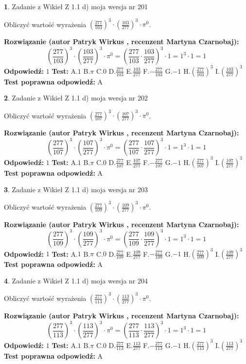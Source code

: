 \documentclass[12pt, a4paper]{article}
\theoremstyle{definition} %
\newtheorem{zad}{}
\newcommand{\zadStart}[1]{\begin{zad}#1\newline}
\newcommand{\zadStop}{\end{zad}}
\newcommand{\rozwStart}[2]{\noindent \textbf{Rozwiązanie (autor #1 , recenzent #2): }\newline}
\newcommand{\rozwStop}{\newline}
\newcommand{\odpStart}{\noindent \textbf{Odpowiedź:}\newline}
\newcommand{\odpStop}{\newline}
\newcommand{\testStart}{\noindent \textbf{Test:}\newline}
\newcommand{\testStop}{\newline}
\newcommand{\kluczStart}{\noindent \textbf{Test poprawna odpowiedź:}\newline}
\newcommand{\kluczStop}{\newline}
\begin{document}
\zadStart{Zadanie z Wikieł Z 1.1 d) moja wersja nr 201}

Obliczyć wartość wyrażenia $(\frac{277}{103})^{3} \cdot (\frac{103}{277})^{3} \cdot \pi^{0}$.
\zadStop
\rozwStart{Patryk Wirkus}{Martyna Czarnobaj}
$$(\frac{277}{103})^{3} \cdot (\frac{103}{277})^{3} \cdot \pi^{0} = (\frac{277}{103} \cdot \frac{103}{277})^{3} \cdot 1 = 1^{3} \cdot 1 = 1$$
\rozwStop
\odpStart
$1$
\odpStop
\testStart
A.$1$ B.$\pi$ C.$0$ D.$\frac{277}{103}$ E.$\frac{103}{277}$
F.$-\frac{277}{103}$ G.$-1$
H.$(\frac{277}{103})^{3}$
I.$(\frac{103}{277})^{3}$
\testStop
\kluczStart
A
\kluczStop



\zadStart{Zadanie z Wikieł Z 1.1 d) moja wersja nr 202}

Obliczyć wartość wyrażenia $(\frac{277}{107})^{3} \cdot (\frac{107}{277})^{3} \cdot \pi^{0}$.
\zadStop
\rozwStart{Patryk Wirkus}{Martyna Czarnobaj}
$$(\frac{277}{107})^{3} \cdot (\frac{107}{277})^{3} \cdot \pi^{0} = (\frac{277}{107} \cdot \frac{107}{277})^{3} \cdot 1 = 1^{3} \cdot 1 = 1$$
\rozwStop
\odpStart
$1$
\odpStop
\testStart
A.$1$ B.$\pi$ C.$0$ D.$\frac{277}{107}$ E.$\frac{107}{277}$
F.$-\frac{277}{107}$ G.$-1$
H.$(\frac{277}{107})^{3}$
I.$(\frac{107}{277})^{3}$
\testStop
\kluczStart
A
\kluczStop



\zadStart{Zadanie z Wikieł Z 1.1 d) moja wersja nr 203}

Obliczyć wartość wyrażenia $(\frac{277}{109})^{3} \cdot (\frac{109}{277})^{3} \cdot \pi^{0}$.
\zadStop
\rozwStart{Patryk Wirkus}{Martyna Czarnobaj}
$$(\frac{277}{109})^{3} \cdot (\frac{109}{277})^{3} \cdot \pi^{0} = (\frac{277}{109} \cdot \frac{109}{277})^{3} \cdot 1 = 1^{3} \cdot 1 = 1$$
\rozwStop
\odpStart
$1$
\odpStop
\testStart
A.$1$ B.$\pi$ C.$0$ D.$\frac{277}{109}$ E.$\frac{109}{277}$
F.$-\frac{277}{109}$ G.$-1$
H.$(\frac{277}{109})^{3}$
I.$(\frac{109}{277})^{3}$
\testStop
\kluczStart
A
\kluczStop



\zadStart{Zadanie z Wikieł Z 1.1 d) moja wersja nr 204}

Obliczyć wartość wyrażenia $(\frac{277}{113})^{3} \cdot (\frac{113}{277})^{3} \cdot \pi^{0}$.
\zadStop
\rozwStart{Patryk Wirkus}{Martyna Czarnobaj}
$$(\frac{277}{113})^{3} \cdot (\frac{113}{277})^{3} \cdot \pi^{0} = (\frac{277}{113} \cdot \frac{113}{277})^{3} \cdot 1 = 1^{3} \cdot 1 = 1$$
\rozwStop
\odpStart
$1$
\odpStop
\testStart
A.$1$ B.$\pi$ C.$0$ D.$\frac{277}{113}$ E.$\frac{113}{277}$
F.$-\frac{277}{113}$ G.$-1$
H.$(\frac{277}{113})^{3}$
I.$(\frac{113}{277})^{3}$
\testStop
\kluczStart
A
\kluczStop
\end{document}
